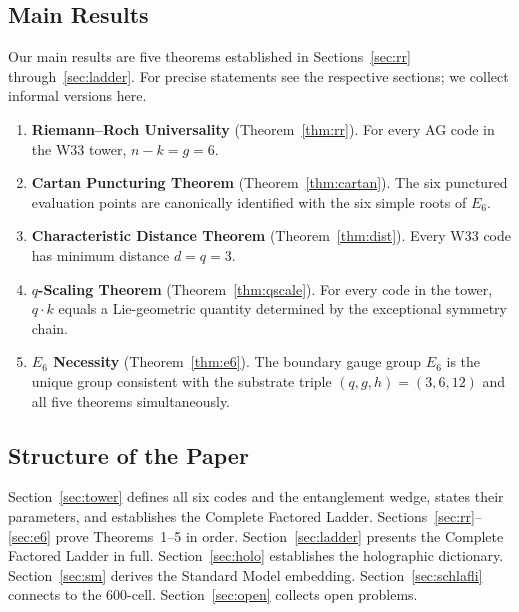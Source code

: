 \documentclass[12pt]{article}
\begin{document}
\subsection{Main Results}

Our main results are five theorems established in Sections~\ref{sec:rr}
through~\ref{sec:ladder}.
For precise statements see the respective sections;
we collect informal versions here.

\begin{enumerate}
 \item \textbf{Riemann--Roch Universality} (Theorem~\ref{thm:rr}).
 For every AG code in the W33 tower, $n - k = g = 6$.

 \item \textbf{Cartan Puncturing Theorem} (Theorem~\ref{thm:cartan}).
 The six punctured evaluation points are canonically identified
 with the six simple roots of $E_6$.

 \item \textbf{Characteristic Distance Theorem} (Theorem~\ref{thm:dist}).
 Every W33 code has minimum distance $d = q = 3$.

 \item \textbf{$q$-Scaling Theorem} (Theorem~\ref{thm:qscale}).
 For every code in the tower, $q \cdot k$ equals a Lie-geometric
 quantity determined by the exceptional symmetry chain.

 \item \textbf{$E_6$ Necessity} (Theorem~\ref{thm:e6}).
 The boundary gauge group $E_6$ is the unique group consistent
 with the substrate triple $(q, g, h) = (3, 6, 12)$
 and all five theorems simultaneously.
\end{enumerate}

\subsection{Structure of the Paper}

Section~\ref{sec:tower} defines all six codes and the entanglement wedge,
states their parameters, and establishes the Complete Factored Ladder.
Sections~\ref{sec:rr}--\ref{sec:e6} prove Theorems~1--5 in order.
Section~\ref{sec:ladder} presents the Complete Factored Ladder in full.
Section~\ref{sec:holo} establishes the holographic dictionary.
Section~\ref{sec:sm} derives the Standard Model embedding.
Section~\ref{sec:schlafli} connects to the $600$-cell.
Section~\ref{sec:open} collects open problems.

\end{document}
